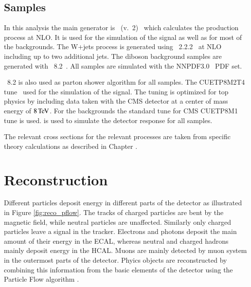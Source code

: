 \subsection{Samples}

In this analysis the main generator is \Powheg~(v.~2)~\cite{bib:powheg2,Frixione:2007vw,Nason:2004rx} which calculates the production process at NLO. 
It is used for the simulation of the \ttbar signal as well as for most of the backgrounds.
The W+jets process is generated using \MGaMCatNLO~2.2.2~\cite{Alwall:2014hca,Frederix:2012ps} at NLO including up to two additional jets. The diboson background samples are generated with \Pythia~8.2~\cite{Sjostrand:2014zea}.
All samples are simulated with the NNPDF3.0~\cite{Ball:2012cx} PDF set.

\Pythia~8.2 is also used as parton shower algorithm for all samples. The CUETP8M2T4 tune~\cite{CMS-PAS-TOP-16-021,Skands:2014pea} used for the simulation of the signal.
The tuning is optimized for top physics by including \ttbar data taken with the CMS detector at a center of mass energy of $8 \,\text{Te\hspace{-.08em}V}$.
For the backgrounds the standard tune for CMS CUETP8M1 tune is used.
 \cite{geant} is used to simulate the detector response for all samples.

The relevant cross sections for the relevant processes are taken from specific theory calculations as described in Chapter .

\section{Reconstruction}
\label{sec:SimReco_Reco}

Different particles deposit energy in different parts of the detector as illustrated in Figure \ref{fig:reco_pflow}.
The tracks of charged particles are bent by the magnetic field, while neutral particles are unaffected.
Similarly only charged particles leave a signal in the tracker.
Electrons and photons deposit the main amount of their energy in the ECAL, whereas neutral and charged hadrons mainly deposit energy in the HCAL.
Muons are mainly detected by muon system in the outermost parts of the detector.
Phyics objects are reconstructed by combining this information from the basic elements of the detector using the Particle Flow algorithm \cite{Sirunyan:2017ulk}.

